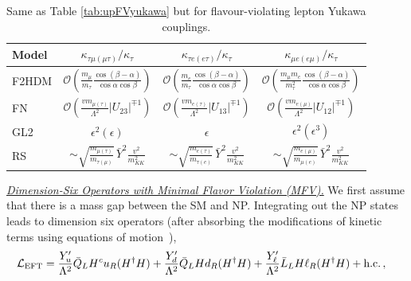 \documentclass[../report.tex]{subfiles}
\newcommand{\mcO}{\mathcal{O}}
\newcommand{\yvmkk}{\bar Y^2 \frac{v^2}{m_{KK}^2}}
\begin{document}
\begin{table}[t]
\begin{center}
\begin{tabular}{l  c  c  c }
	\toprule[0.1em]
	Model	&   $\kappa_{\tau\mu (\mu\tau)}/\kappa_\tau$ & $\kappa_{\tau e (e\tau)}/\kappa_\tau$  & $\kappa_{\mu e (e\mu)}/\kappa_\tau$ \\ \midrule[0.05em]\vspace{0.15cm}
	F2HDM & $\mcO\left(\frac{m_\mu}{m_\tau}\frac{\cos(\beta-\alpha)}{\cos\alpha\cos\beta}\right)$ & $\mcO\left(\frac{m_e}{m_\tau}\frac{\cos(\beta-\alpha)}{\cos\alpha\cos\beta}\right)$ & $\mcO\left(\frac{m_\mu m_e}{m_\tau^2}\frac{\cos(\beta-\alpha)}{\cos\alpha\cos\beta}\right)$ \\\vspace{0.15cm}
		FN & $\mathcal{O}\left(\frac{v m_{\mu(\tau)}}{\Lambda^2} |U_{23}|^{\mp1}\right)$ & $\mathcal{O}\left(\frac{v m_{e(\tau)}}{\Lambda^2}|U_{13}|^{\mp1}\right)$ & $\mathcal{O}\left(\frac{v m_{e(\mu)}}{\Lambda^2}|U_{12}|^{\mp1}\right)$ \\\vspace{0.15cm}
GL2	&$\epsilon^2 (\epsilon)$ & $\epsilon$ & $\epsilon^2(\epsilon^3)$\\
	RS & $\sim\sqrt{\frac{m_{\mu(\tau)}}{m_{\tau(\mu)}}}\,\yvmkk$ &
		$\sim\sqrt{\frac{m_{e(\tau)}}{m_{\tau(e)}}}\,\yvmkk$&
		$\sim\sqrt{\frac{m_{e(\mu)}}{m_{\mu(e)}}}\,\yvmkk$\\
	\bottomrule[0.1em]
\end{tabular}
\caption{Same as Table  \ref{tab:upFVyukawa} but for flavour-violating lepton Yukawa couplings. 
}
\label{tab:leptFVyukawa}
\end{center}
\end{table}
\underline{\it Dimension-Six Operators with Minimal Flavor Violation (MFV).}
We first assume that there is a mass gap between the SM and NP. Integrating out the NP states leads to dimension six operators (after absorbing the modifications of kinetic terms using equations of motion~\cite{AguilarSaavedra:2009mx}), 
\begin{equation}
\begin{split}\label{eq:EFT:MFV}
	\mathcal{L}_{\rm EFT} &=  \frac{Y_u^\prime}{\Lambda^2}\bar{Q}_L H^c u_R
        (H^\dagger H)+ \frac{Y_d^\prime}{\Lambda^2} \bar{Q}_L H d_R
        (H^\dagger H)+\frac{Y_\ell^\prime}{\Lambda^2} \bar{L}_L H \ell_R
        (H^\dagger H)+\text{h.c.}\,, 
\end{split}
\end{equation}
\end{document}
